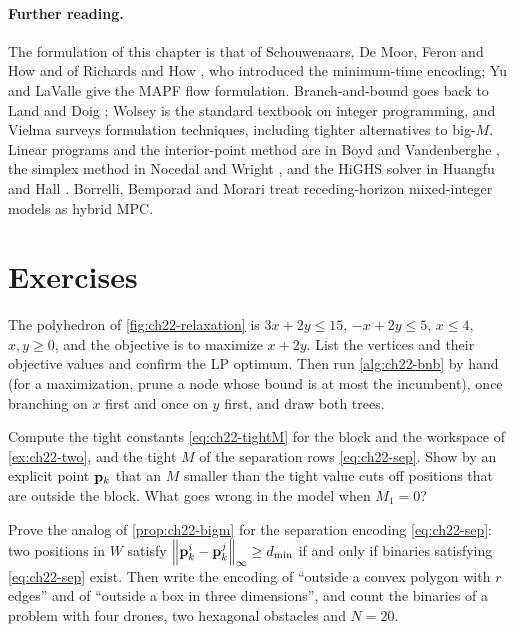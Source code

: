 \paragraph{Further reading.}
The formulation of this chapter is that of Schouwenaars, De Moor, Feron
and How \cite{schouwenaars2001mixed} and of Richards and How
\cite{richards2002aircraft}, who introduced the minimum-time encoding; Yu
and LaValle \cite{yu2016optimal} give the MAPF flow formulation.
Branch-and-bound goes back to Land and Doig \cite{landdoig1960automatic};
Wolsey \cite{wolsey1998integer} is the standard textbook on integer
programming, and Vielma \cite{vielma2015mixed} surveys formulation
techniques, including tighter alternatives to big-$M$. Linear programs and
the interior-point method are in Boyd and Vandenberghe
\cite{boyd2004convex}, the simplex method in Nocedal and Wright
\cite{nocedal2006numerical}, and the HiGHS solver in Huangfu and Hall
\cite{huangfu2018parallelizing}. Borrelli, Bemporad and Morari
\cite{borrelli2017predictive} treat receding-horizon mixed-integer models
as hybrid MPC.

\section{Exercises}
\label{sec:ch22-exercises}

\begin{exercise}[\difficulty{1}]
\label{exr:ch22-lp}
The polyhedron of \cref{fig:ch22-relaxation} is $3x + 2y \le 15$,
$-x + 2y \le 5$, $x \le 4$, $x, y \ge 0$, and the objective is to maximize
$x + 2y$. List the vertices and their objective values and confirm the LP
optimum. Then run \cref{alg:ch22-bnb} by hand (for a maximization, prune
a node whose bound is at most the incumbent), once branching on $x$ first
and once on $y$ first, and draw both trees.
\end{exercise}

\begin{exercise}[\difficulty{1}]
\label{exr:ch22-tightm}
Compute the tight constants \cref{eq:ch22-tightM} for the block and the
workspace of \cref{ex:ch22-two}, and the tight $M$ of the separation rows
\cref{eq:ch22-sep}. Show by an explicit point $\mathbf{p}_k$ that an $M$ smaller
than the tight value cuts off positions that are outside the block. What
goes wrong in the model when $M_1 = 0$?
\end{exercise}

\begin{exercise}[\difficulty{2}]
\label{exr:ch22-separation}
Prove the analog of \cref{prop:ch22-bigm} for the separation encoding
\cref{eq:ch22-sep}: two positions in $W$ satisfy $\left\lVert \mathbf{p}^i_k -
\mathbf{p}^j_k \right\rVert_\infty \ge d_{\min}$ if and only if binaries satisfying
\cref{eq:ch22-sep} exist. Then write the encoding of ``outside a convex
polygon with $r$ edges'' and of ``outside a box in three dimensions'', and
count the binaries of a problem with four drones, two hexagonal obstacles
and $N = 20$.
\end{exercise}

